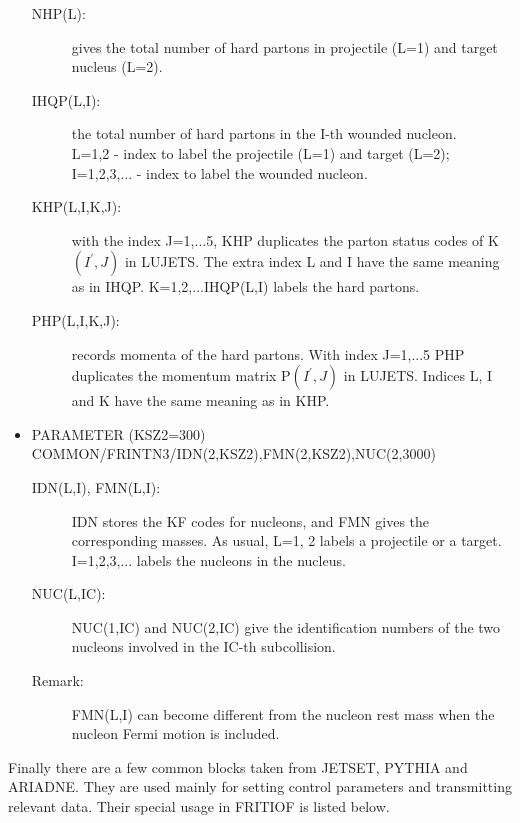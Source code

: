 \begin{itemize}
\begin{description}
\item[NHP(L): ] gives the total number of hard partons in projectile (L=1)
        and target nucleus (L=2).
\item[IHQP(L,I):] the total number of hard partons in the I-th wounded
      nucleon.\\ 
      L=1,2 - index to label the projectile (L=1) and target (L=2); \\
      I=1,2,3,... - index to label the wounded nucleon.
\item[KHP(L,I,K,J): ] with the index J=1,...5, KHP duplicates the parton 
      status codes of K$(I^\prime, J)$ in LUJETS.  The extra index L and I
      have the same meaning as in IHQP.  K=1,2,...IHQP(L,I) labels the
      hard partons. \\
\item[PHP(L,I,K,J): ] records momenta of the hard partons.  With index
      J=1,...5 PHP duplicates the momentum matrix P$(I^\prime, J)$ in LUJETS.
      Indices L, I and K have the same meaning as in KHP.
\end{description}

\item{PARAMETER (KSZ2=300) \\
      COMMON/FRINTN3/IDN(2,KSZ2),FMN(2,KSZ2),NUC(2,3000)}
\begin{description}
\item[IDN(L,I), FMN(L,I): ] IDN stores the KF codes for nucleons, and FMN
      gives the corresponding masses.  As usual, L=1, 2 labels a
      projectile or a target.  I=1,2,3,... labels the nucleons in the nucleus.
\item[NUC(L,IC): ] NUC(1,IC) and NUC(2,IC) give the identification numbers 
      of the two nucleons involved in the IC-th subcollision.
\item[Remark: ] FMN(L,I) can become different from the nucleon rest mass
      when the nucleon Fermi motion is included.    
\end{description}


\end{itemize} 

Finally there are a few common blocks taken from JETSET, PYTHIA and ARIADNE.
They are used mainly for setting control parameters and transmitting relevant
data.  Their special usage in FRITIOF is listed below.

